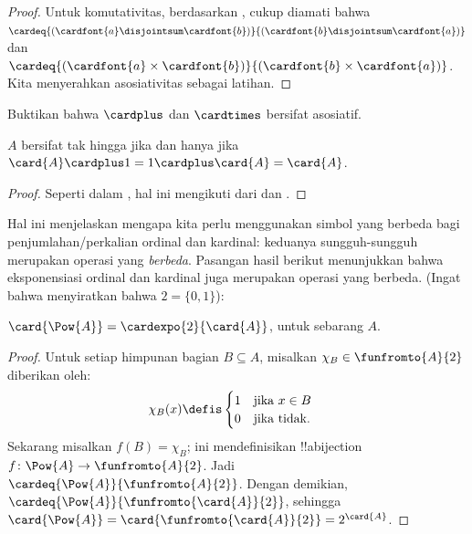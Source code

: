 \documentclass[../../../include/open-logic-section]{subfiles}
\begin{document}
\begin{proof}
Untuk komutativitas, berdasarkan
, cukup diamati bahwa
$\cardeq{(\cardfont{a} \disjointsum
\cardfont{b})}{(\cardfont{b} \disjointsum \cardfont{a})}$ dan
$\cardeq{(\cardfont{a} \times \cardfont{b})}{(\cardfont{b} \times
\cardfont{a})}$. Kita menyerahkan asosiativitas sebagai latihan.
\end{proof}

\begin{prob}
Buktikan bahwa $\cardplus$ dan $\cardtimes$ bersifat asosiatif.
\end{prob}

\begin{prop}
$A$ bersifat tak hingga jika dan hanya jika
$\card{A} \cardplus 1 = 1 \cardplus \card{A} = \card{A}$.
\end{prop}

\begin{proof}
Seperti dalam , hal ini
mengikuti dari
 dan
.
\end{proof}

Hal ini menjelaskan mengapa kita perlu menggunakan simbol yang berbeda bagi
penjumlahan/perkalian ordinal dan kardinal: keduanya sungguh-sungguh
merupakan operasi yang \emph{berbeda}. Pasangan hasil berikut menunjukkan
bahwa eksponensiasi ordinal dan kardinal juga merupakan operasi yang berbeda.
(Ingat bahwa  menyiratkan bahwa
$2 = \{0, 1\}$):

\begin{lem}
$\card{\Pow{A}} = \cardexpo{2}{\card{A}}$, untuk sebarang $A$.
\end{lem}

\begin{proof}
Untuk setiap himpunan bagian $B \subseteq A$, misalkan
$\chi_B \in \funfromto{A}{2}$ diberikan oleh:
\begin{align*}
	\chi_{B}(x) &\defis
	\begin{cases}
		1 & \text{jika }x\in B\\
		0 & \text{jika tidak.}
	\end{cases}
\end{align*}
Sekarang misalkan $f(B) = \chi_B$; ini mendefinisikan !!a{bijection}
$f \colon \Pow{A} \to \funfromto{A}{2}$. Jadi
$\cardeq{\Pow{A}}{\funfromto{A}{2}}$. Dengan demikian,
$\cardeq{\Pow{A}}{\funfromto{\card{A}}{2}}$, sehingga
$\card{\Pow{A}} = \card{\funfromto{\card{A}}{2}} =
2^{\card{A}}$.
\end{proof}
\end{document}
